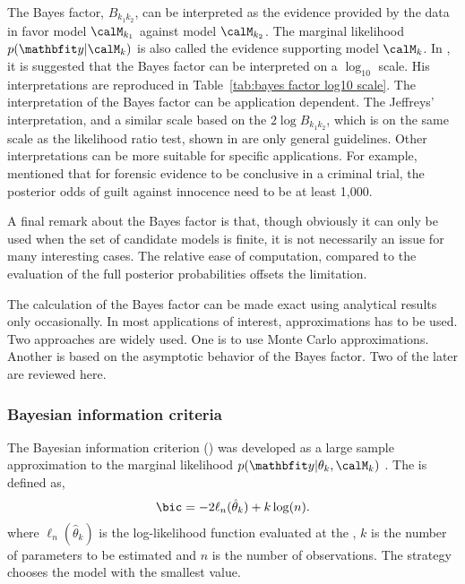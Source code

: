 The Bayes factor, $B_{k_1k_2}$, can be interpreted as the evidence provided by
the data in favor model $\calM_{k_1}$ against model $\calM_{k_2}$. The
marginal likelihood $p(\data|\calM_k)$ is also called the evidence supporting
model $\calM_k$. In \cite{Jeffreys:1961ua}, it is suggested that the Bayes
factor can be interpreted on a $\log_{10}$ scale. His interpretations are
reproduced in Table~\ref{tab:bayes factor log10 scale}. The interpretation of
the Bayes factor can be application dependent. The Jeffreys' interpretation,
and a similar scale based on the $2\log B_{k_1k_2}$, which is on the same
scale as the likelihood ratio test, shown in \cite{Kass:1995vb} are only
general guidelines. Other interpretations can be more suitable for specific
applications. For example, \cite{Kass:1995vb} mentioned that for forensic
evidence to be conclusive in a criminal trial, the posterior odds of guilt
against innocence need to be at least 1,000.

A final remark about the Bayes factor is that, though obviously it can only be
used when the set of candidate models is finite, it is not necessarily an
issue for many interesting cases. The relative ease of computation, compared
to the evaluation of the full posterior probabilities offsets the limitation.



The calculation of the Bayes factor can be made exact using analytical results
only occasionally. In most applications of interest, approximations has to be
used. Two approaches are widely used. One is to use Monte Carlo
approximations. Another is based on the asymptotic behavior of the Bayes
factor. Two of the later are reviewed here.

\subsubsection{Bayesian information criteria}
\label{ssub:Bayesian information criteria}

The Bayesian information criterion (\bic) was developed as a large sample
approximation to the marginal likelihood $p(\data|\theta_k,\calM_k)$
\cite{Schwarz:1978uv}. The \bic is defined as,
\begin{equation}
  \text{\bic} = -2\ell_n(\hat\theta_k) + k\log(n).
  \label{eq:bic}
\end{equation}
where $\ell_n(\hat\theta_k)$ is the log-likelihood function evaluated at the
\mle, $k$ is the number of parameters to be estimated and $n$ is the number of
observations. The \bic strategy chooses the model with the smallest \bic
value.

